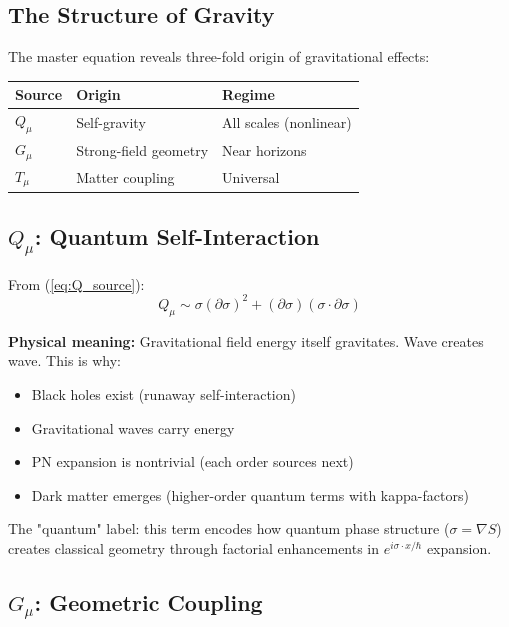 \documentclass[11pt,a4paper]{article}
\theoremstyle{definition}
\theoremstyle{remark}
\begin{document}
		\subsection{The Structure of Gravity}
		
		The master equation reveals three-fold origin of gravitational effects:
		
		\begin{center}
			\begin{tabular}{@{}lll@{}}
				\toprule
				\textbf{Source} & \textbf{Origin} & \textbf{Regime}\\
				\midrule
				$Q_\mu$ & Self-gravity & All scales (nonlinear)\\
				$G_\mu$ & Strong-field geometry & Near horizons\\
				$T_\mu$ & Matter coupling & Universal\\
				\bottomrule
			\end{tabular}
		\end{center}
		
		\subsection{$Q_\mu$: Quantum Self-Interaction}
		
		From (\ref{eq:Q_source}):
		\begin{equation}
			Q_\mu \sim \sigma(\partial\sigma)^2 + (\partial\sigma)(\sigma \cdot \partial\sigma)
		\end{equation}
		
		\textbf{Physical meaning:} Gravitational field energy itself gravitates. Wave creates wave. This is why:
		\begin{itemize}
			\item Black holes exist (runaway self-interaction)
			\item Gravitational waves carry energy
			\item PN expansion is nontrivial (each order sources next)
			\item Dark matter emerges (higher-order quantum terms with kappa-factors)
		\end{itemize}
		
		The "quantum" label: this term encodes how quantum phase structure ($\sigma = \nabla S$) creates classical geometry through factorial enhancements in $e^{i\sigma \cdot x/\hbar}$ expansion.
		
		\subsection{$G_\mu$: Geometric Coupling}
		
\end{document}
